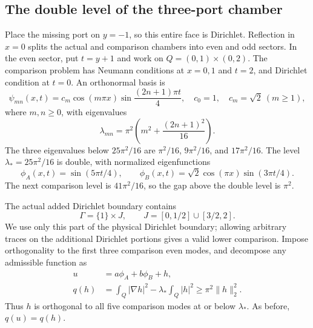 \documentclass[11pt,reqno]{amsart}
\numberwithin{equation}{section}
\begin{document}
\subsection{The double level of the three-port chamber}
\label{bd:three-port}

Place the missing port on $y=-1$, so this entire face is Dirichlet.
Reflection in $x=0$ splits the actual and comparison chambers into even
and odd sectors. In the even sector, put $t=y+1$ and work on
$Q=(0,1)\times(0,2)$. The comparison problem has Neumann conditions at
$x=0,1$ and $t=2$, and Dirichlet condition at $t=0$. An orthonormal
basis is
\begin{equation}
 \psi_{mn}(x,t)=c_m\cos(m\pi x)\sin\frac{(2n+1)\pi t}{4},
 \quad
 c_0=1,\quad c_m=\sqrt2\ (m\ge1),
 \label{bd:even-basis}
\end{equation}
where $m,n\ge0$, with eigenvalues
\[
 \lambda_{mn}=\pi^2\left(m^2+\frac{(2n+1)^2}{16}\right).
\]
The three eigenvalues below $25\pi^2/16$ are
$\pi^2/16$, $9\pi^2/16$, and $17\pi^2/16$. The level
$\lambda_*=25\pi^2/16$ is double, with normalized eigenfunctions
\[
 \phi_A(x,t)=\sin(5\pi t/4),\qquad
 \phi_B(x,t)=\sqrt2\cos(\pi x)\sin(3\pi t/4).
\]
The next comparison level is $41\pi^2/16$, so the gap above the double
level is $\pi^2$.

The actual added Dirichlet boundary contains
\[
 \Gamma=\{1\}\times J,\qquad
 J=[0,1/2]\cup[3/2,2].
\]
We use only this part of the physical Dirichlet boundary; allowing
arbitrary traces on the additional Dirichlet portions gives a valid
lower comparison. Impose orthogonality to the first three comparison
even modes, and decompose any admissible function as
\begin{equation}
 \begin{aligned}
  u&=a\phi_A+b\phi_B+h,\\
  q(h)&=\int_Q|\nabla h|^2-\lambda_*\int_Q|h|^2
        \ge\pi^2\|h\|_2^2.
 \end{aligned}
 \label{bd:cluster-decomposition}
\end{equation}
Thus $h$ is orthogonal to all five comparison modes at or below
$\lambda_*$. As before, $q(u)=q(h)$.
\end{document}
